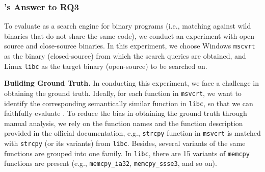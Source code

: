 \subsubsection{\tool's Answer to RQ3}
To evaluate \tool as a search engine for binary programs (i.e., matching against wild binaries that do not share the same code), we conduct an experiment with open-source and close-source binaries. %
In this experiment, we choose Windows \texttt{mscvrt} as the binary (closed-source) from which the search queries are obtained, and Linux \texttt{libc} as the target binary (open-source) to be searched on. %

\noindent\textbf{Building Ground Truth.} In conducting this experiment, we face a challenge in obtaining the ground truth. Ideally, for each function in \texttt{msvcrt}, we want to identify the corresponding semantically similar function in \texttt{libc}, so that we can faithfully evaluate \tool. %
To reduce the bias in obtaining the ground truth through manual analysis, we rely on the function names and the function description provided in the official documentation, e.g., \texttt{strcpy} function in \texttt{msvcrt} is matched with \texttt{strcpy} (or its variants) from \texttt{libc}. %
Besides, several variants of the same functions are grouped into one family. In \texttt{libc}, there are 15 variants of \texttt{memcpy} functions are present (e.g., \texttt{memcpy\_ia32}, \texttt{memcpy\_ssse3}, and so on). 

